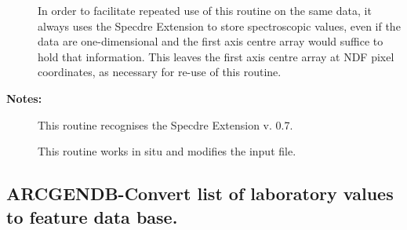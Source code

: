 \begin{description}
\begin{terminalv}
   In order to facilitate repeated use of this routine on the same
   data, it always uses the Specdre Extension to store spectroscopic
   values, even if the data are one-dimensional and the first axis
   centre array would suffice to hold that information. This leaves
   the first axis centre array at NDF pixel coordinates, as
   necessary for re-use of this routine.

\end{terminalv}

\item [\textbf{Notes:}]
This routine recognises the Specdre Extension v. 0.7.

This routine works in situ and modifies the input file.

\end{description}
\subsection{ARCGENDB-\label{ARCGENDB}Convert list of laboratory values to feature data base.}
